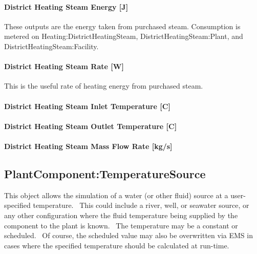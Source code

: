 \paragraph{District Heating Steam Energy {[}J{]}}\label{district-heating-Steam-energy-j}

These outputs are the energy taken from purchased steam. Consumption is metered on Heating:DistrictHeatingSteam, DistrictHeatingSteam:Plant, and DistrictHeatingSteam:Facility.

\paragraph{District Heating Steam Rate {[}W{]}}\label{district-heating-steam-rate-w}

This is the useful rate of heating energy from purchased steam.

\paragraph{District Heating Steam Inlet Temperature {[}C{]}}\label{district-heating-steam-inlet-temperature-c}

\paragraph{District Heating Steam Outlet Temperature {[}C{]}}\label{district-heating-steam-outlet-temperature-c}

\paragraph{District Heating Steam Mass Flow Rate {[}kg/s{]}}\label{district-heating-steam-mass-flow-rate-kgs}

\subsection{PlantComponent:TemperatureSource}\label{plantcomponenttemperaturesource}

This object allows the simulation of a water (or other fluid) source at a user-specified temperature.~ This could include a river, well, or seawater source, or any other configuration where the fluid temperature being supplied by the component to the plant is known.~ The temperature may be a constant or scheduled.~ Of course, the scheduled value may also be overwritten via EMS in cases where the specified temperature should be calculated at run-time.

